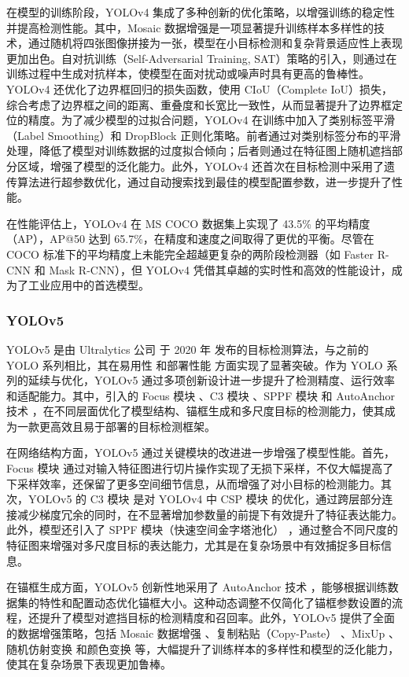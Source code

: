\documentclass[11pt,twocolumn]{ctexart}
\begin{document}
在模型的训练阶段，YOLOv4 集成了多种创新的优化策略，以增强训练的稳定性并提高检测性能。其中，Mosaic 数据增强是一项显著提升训练样本多样性的技术，通过随机将四张图像拼接为一张，模型在小目标检测和复杂背景适应性上表现更加出色。自对抗训练（Self-Adversarial Training, SAT）策略的引入，则通过在训练过程中生成对抗样本，使模型在面对扰动或噪声时具有更高的鲁棒性。YOLOv4 还优化了边界框回归的损失函数，使用 CIoU（Complete IoU）损失，综合考虑了边界框之间的距离、重叠度和长宽比一致性，从而显著提升了边界框定位的精度。为了减少模型的过拟合问题，YOLOv4 在训练中加入了类别标签平滑（Label Smoothing）和 DropBlock 正则化策略。前者通过对类别标签分布的平滑处理，降低了模型对训练数据的过度拟合倾向；后者则通过在特征图上随机遮挡部分区域，增强了模型的泛化能力。此外，YOLOv4 还首次在目标检测中采用了遗传算法进行超参数优化，通过自动搜索找到最佳的模型配置参数，进一步提升了性能。

在性能评估上，YOLOv4 在 MS COCO 数据集上实现了 43.5\% 的平均精度（AP），AP@50 达到 65.7\%，在精度和速度之间取得了更优的平衡。尽管在 COCO 标准下的平均精度上未能完全超越更复杂的两阶段检测器（如 Faster R-CNN 和 Mask R-CNN），但 YOLOv4 凭借其卓越的实时性和高效的性能设计，成为了工业应用中的首选模型。
\subsubsection{YOLOv5}
YOLOv5 是由 Ultralytics 公司 于 2020 年 发布的目标检测算法，与之前的 YOLO 系列相比，其在易用性 和部署性能 方面实现了显著突破。作为 YOLO 系列的延续与优化，YOLOv5 通过多项创新设计进一步提升了检测精度、运行效率和适配能力。其中，引入的 Focus 模块 、C3 模块 、SPPF 模块 和 AutoAnchor 技术 ，在不同层面优化了模型结构、锚框生成和多尺度目标的检测能力，使其成为一款更高效且易于部署的目标检测框架。

在网络结构方面，YOLOv5 通过关键模块的改进进一步增强了模型性能。首先，Focus 模块 通过对输入特征图进行切片操作实现了无损下采样，不仅大幅提高了下采样效率，还保留了更多空间细节信息，从而增强了对小目标的检测能力。其次，YOLOv5 的 C3 模块 是对 YOLOv4 中 CSP 模块 的优化，通过跨层部分连接减少梯度冗余的同时，在不显著增加参数量的前提下有效提升了特征表达能力。此外，模型还引入了 SPPF 模块（快速空间金字塔池化） ，通过整合不同尺度的特征图来增强对多尺度目标的表达能力，尤其是在复杂场景中有效捕捉多目标信息。

在锚框生成方面，YOLOv5 创新性地采用了 AutoAnchor 技术 ，能够根据训练数据集的特性和配置动态优化锚框大小。这种动态调整不仅简化了锚框参数设置的流程，还提升了模型对遮挡目标的检测精度和召回率。此外，YOLOv5 提供了全面的数据增强策略，包括 Mosaic 数据增强 、复制粘贴（Copy-Paste） 、MixUp 、随机仿射变换 和颜色变换 等，大幅提升了训练样本的多样性和模型的泛化能力，使其在复杂场景下表现更加鲁棒。
\end{document}

